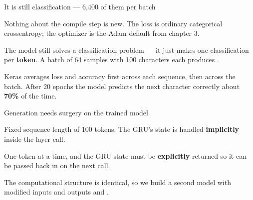 \documentclass[aspectratio=169,11pt,t]{beamer}
\begin{document}
\begin{frame}[shrink=25]{It is still classification --- 6,400 of them per batch}
{\fontsize{9.4}{12.6}\selectfont\color{fg2}Nothing about the compile step is new. The loss is ordinary categorical crossentropy; the optimizer is the Adam default from chapter 3.\par}\vskip 4pt
{\fontsize{9.4}{12.6}\selectfont\color{fg2}The model still solves a classification problem --- it just makes one classification per \textbf{token}. A batch of 64 samples with 100 characters each produces .\par}\vskip 4pt
{\fontsize{9.4}{12.6}\selectfont\color{fg2}Keras averages loss and accuracy first across each sequence, then across the batch. After 20 epochs the model predicts the next character correctly about \textbf{70\%} of the time.\par}\vskip 4pt
\end{frame}

\begin{frame}[shrink=25]{Generation needs surgery on the trained model}
\begin{minipage}[t]{0.494\textwidth}
\begin{icard}
Fixed sequence length of 100 tokens. The GRU's state is handled \textbf{implicitly} inside the layer call.
\end{icard}
\end{minipage}%
\hfill
\begin{minipage}[t]{0.494\textwidth}
\begin{icardaccent}
One token at a time, and the GRU state must be \textbf{explicitly} returned so it can be passed back in on the next call.
\end{icardaccent}
\end{minipage}%
{\fontsize{9.4}{12.6}\selectfont\color{fg2}The computational structure is identical, so we build a second model with modified inputs and outputs and .\par}\vskip 4pt
\end{frame}
\end{document}
